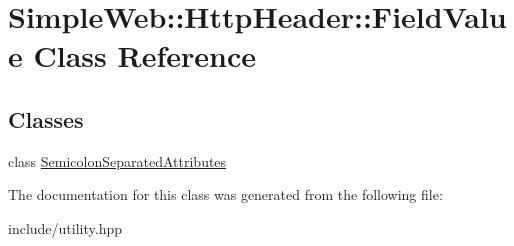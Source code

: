 \hypertarget{classSimpleWeb_1_1HttpHeader_1_1FieldValue}{}\section{Simple\+Web\+:\+:Http\+Header\+:\+:Field\+Value Class Reference}
\label{classSimpleWeb_1_1HttpHeader_1_1FieldValue}
\subsection*{Classes}
\begin{DoxyCompactItemize}
\item 
class \hyperlink{classSimpleWeb_1_1HttpHeader_1_1FieldValue_1_1SemicolonSeparatedAttributes}{Semicolon\+Separated\+Attributes}
\end{DoxyCompactItemize}


The documentation for this class was generated from the following file\+:\begin{DoxyCompactItemize}
\item 
include/utility.\+hpp\end{DoxyCompactItemize}

